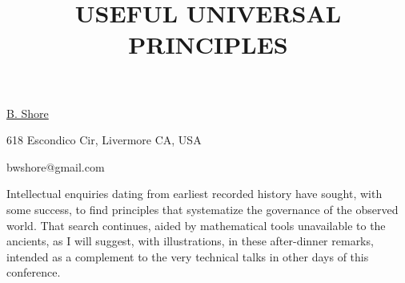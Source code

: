 \title{USEFUL UNIVERSAL PRINCIPLES}

\underline{B. Shore} 

{\normalsize{\vspace{-4mm}}
618 Escondico Cir, Livermore CA, USA

\email bwshore@gmail.com}

Intellectual enquiries dating from earliest recorded history have sought, with some success, to find principles that systematize the
governance of  the observed world. That search continues, aided by mathematical tools unavailable to the ancients, as I will suggest,
with illustrations, in these after-dinner  remarks, intended as a complement to the very technical talks in other days of this
conference.

\vspace{\baselineskip}

